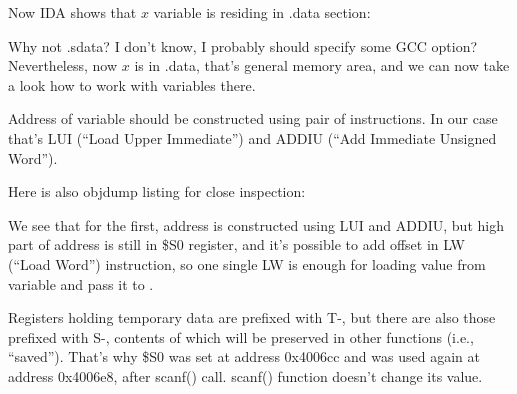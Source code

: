 Now IDA shows that $x$ variable is residing in .data section:



Why not .sdata? I don't know, I probably should specify some GCC option?
Nevertheless, now $x$ is in .data, that's general memory area, and we can now take a look
how to work with variables there.

Address of variable should be constructed using pair of instructions.
In our case that's LUI (``Load Upper Immediate'') and ADDIU (``Add Immediate Unsigned Word'').

Here is also objdump listing for close inspection:



We see that for the first, address is constructed using LUI and ADDIU, but high part of address is still in
\$S0 register, and it's possible to add offset in LW (``Load Word'') instruction, so one single LW is enough 
for loading value from variable and pass it to \printf.

Registers holding temporary data are prefixed with T-, but there are also those prefixed with S-, 
contents of which will be preserved in other functions (i.e., ``saved''). 
That's why \$S0 was set at address 0x4006cc and was used again
at address 0x4006e8, after scanf() call. 
scanf() function doesn't change its value.


\fi
